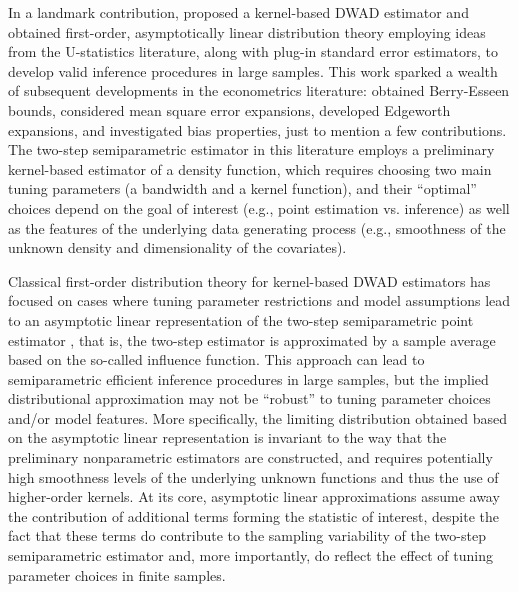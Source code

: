 \documentclass[11pt]{article}
\numberwithin{equation}{section}
\theoremstyle{definition}
\begin{document}
In a landmark contribution, \citet{Powell-Stock-Stoker_1989_ECMA} proposed a kernel-based DWAD estimator and obtained first-order, asymptotically linear distribution theory employing ideas from the U-statistics literature, along with plug-in standard error estimators, to develop valid inference procedures in large samples. This work sparked a wealth of subsequent developments in the econometrics literature: \citet{Robinson_1995_ECMA} obtained Berry-Esseen bounds, \citet{Powell-Stoker_1996_JoE} considered mean square error expansions, \citet{Nishiyama-Robinson_2000_ECMA,Nishiyama-Robinson_2001_ChBook,Nishiyama-Robinson_2005_ECMA} developed Edgeworth expansions, and \citet{Newey-Hsieh-Robins_2004_Ecma} investigated bias properties, just to mention a few contributions. The two-step semiparametric estimator in this literature employs a preliminary kernel-based estimator of a density function, which requires choosing two main tuning parameters (a bandwidth and a kernel function), and their ``optimal'' choices depend on the goal of interest (e.g., point estimation vs. inference) as well as the features of the underlying data generating process (e.g., smoothness of the unknown density and dimensionality of the covariates).  

Classical first-order distribution theory for kernel-based DWAD estimators has focused on cases where tuning parameter restrictions and model assumptions lead to an asymptotic linear representation of the two-step semiparametric point estimator \citep[][for overviews]{Newey-McFadden_1994_Handbook,Ichimura-Todd_2007_Handbook}, that is, the two-step estimator is approximated by a sample average based on the so-called influence function. This approach can lead to semiparametric efficient inference procedures in large samples, but the implied distributional approximation may not be ``robust'' to tuning parameter choices and/or model features. More specifically, the limiting distribution obtained based on the asymptotic linear representation is invariant to the way that the preliminary nonparametric estimators are constructed, and requires potentially high smoothness levels of the underlying unknown functions and thus the use of higher-order kernels. At its core, asymptotic linear approximations assume away the contribution of additional terms forming the statistic of interest, despite the fact that these terms do contribute to the sampling variability of the two-step semiparametric estimator and, more importantly, do reflect the effect of tuning parameter choices in finite samples.
\end{document}

